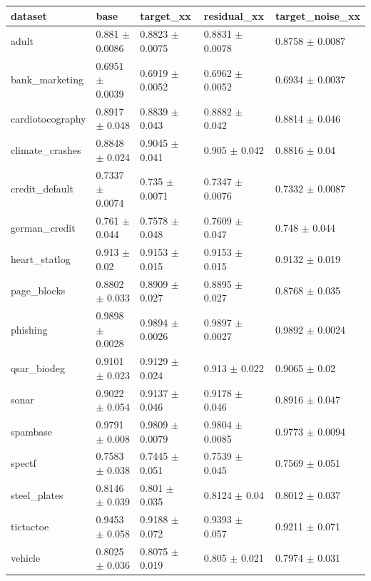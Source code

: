\begin{tabular}{lllll}
\toprule
dataset & base & target\_xx & residual\_xx & target\_noise\_xx \\
\midrule
adult & 0.881 $\pm$ 0.0086 & 0.8823 $\pm$ 0.0075 & 0.8831 $\pm$ 0.0078 & 0.8758 $\pm$ 0.0087 \\
bank\_marketing & 0.6951 $\pm$ 0.0039 & 0.6919 $\pm$ 0.0052 & 0.6962 $\pm$ 0.0052 & 0.6934 $\pm$ 0.0037 \\
cardiotocography & 0.8917 $\pm$ 0.048 & 0.8839 $\pm$ 0.043 & 0.8882 $\pm$ 0.042 & 0.8814 $\pm$ 0.046 \\
climate\_crashes & 0.8848 $\pm$ 0.024 & 0.9045 $\pm$ 0.041 & 0.905 $\pm$ 0.042 & 0.8816 $\pm$ 0.04 \\
credit\_default & 0.7337 $\pm$ 0.0074 & 0.735 $\pm$ 0.0071 & 0.7347 $\pm$ 0.0076 & 0.7332 $\pm$ 0.0087 \\
german\_credit & 0.761 $\pm$ 0.044 & 0.7578 $\pm$ 0.048 & 0.7609 $\pm$ 0.047 & 0.748 $\pm$ 0.044 \\
heart\_statlog & 0.913 $\pm$ 0.02 & 0.9153 $\pm$ 0.015 & 0.9153 $\pm$ 0.015 & 0.9132 $\pm$ 0.019 \\
page\_blocks & 0.8802 $\pm$ 0.033 & 0.8909 $\pm$ 0.027 & 0.8895 $\pm$ 0.027 & 0.8768 $\pm$ 0.035 \\
phishing & 0.9898 $\pm$ 0.0028 & 0.9894 $\pm$ 0.0026 & 0.9897 $\pm$ 0.0027 & 0.9892 $\pm$ 0.0024 \\
qsar\_biodeg & 0.9101 $\pm$ 0.023 & 0.9129 $\pm$ 0.024 & 0.913 $\pm$ 0.022 & 0.9065 $\pm$ 0.02 \\
sonar & 0.9022 $\pm$ 0.054 & 0.9137 $\pm$ 0.046 & 0.9178 $\pm$ 0.046 & 0.8916 $\pm$ 0.047 \\
spambase & 0.9791 $\pm$ 0.008 & 0.9809 $\pm$ 0.0079 & 0.9804 $\pm$ 0.0085 & 0.9773 $\pm$ 0.0094 \\
spectf & 0.7583 $\pm$ 0.038 & 0.7445 $\pm$ 0.051 & 0.7539 $\pm$ 0.045 & 0.7569 $\pm$ 0.051 \\
steel\_plates & 0.8146 $\pm$ 0.039 & 0.801 $\pm$ 0.035 & 0.8124 $\pm$ 0.04 & 0.8012 $\pm$ 0.037 \\
tictactoe & 0.9453 $\pm$ 0.058 & 0.9188 $\pm$ 0.072 & 0.9393 $\pm$ 0.057 & 0.9211 $\pm$ 0.071 \\
vehicle & 0.8025 $\pm$ 0.036 & 0.8075 $\pm$ 0.019 & 0.805 $\pm$ 0.021 & 0.7974 $\pm$ 0.031 \\
\bottomrule
\end{tabular}

